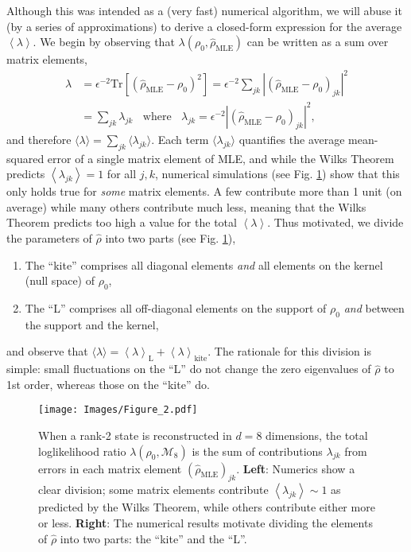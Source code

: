 \documentclass[aps,pra, twocolumn]{revtex4}
\newcommand{\expect}[1]{\ensuremath{\left\langle#1\right\rangle}}
\newcommand{\rhohat}{\hat{\rho}}
\newcommand{\rhoMLE}{\rhohat_{\scriptscriptstyle\mathrm{MLE}}}
\begin{document}
Although this was intended as a (very fast) numerical algorithm, we will abuse it (by a series of approximations) to derive a closed-form expression for the average $\expect{\lambda}$.  We begin by observing that $\lambda(\rho_{0}, \rhoMLE)$ can be written as a sum over matrix elements,
\begin{align}
\label{eq:llrserrors}
\nonumber \lambda &=\epsilon^{-2}\mathrm{Tr}[(\rhoMLE - \rho_{0})^{2}] = \epsilon^{-2}\sum_{jk}|(\rhoMLE- \rho_{0} )_{jk}|^{2}\\
&= \sum_{jk}\lambda_{jk}~~~~\text{where}~~~~\lambda_{jk} = \epsilon^{-2}|(\rhoMLE - \rho_{0} )_{jk} |^{2},
\end{align}
and therefore $\langle \lambda \rangle = \sum_{jk}\langle\lambda_{jk}\rangle$.  Each term $\langle \lambda_{jk}\rangle$ quantifies the average mean-squared error of a single matrix element of MLE, and while the Wilks Theorem predicts $\expect{\lambda_{jk}}=1$ for all $j,k$, numerical simulations (see Fig. \ref{fig:L}) show that this only holds true for \emph{some} matrix elements.  A few contribute more than 1 unit (on average) while many others contribute much less, meaning that the Wilks Theorem predicts too high a value for the total $\expect{\lambda}$.  Thus motivated, we divide the parameters of $\rhohat$ into two parts (see Fig. \ref{fig:L}),
\begin{enumerate}[noitemsep]
\item The ``kite'' comprises all diagonal elements \emph{and} all elements on the kernel (null space) of $\rho_0$,
\item The ``L'' comprises all off-diagonal elements on the support of $\rho_0$ \emph{and} between the support and the kernel,
\end{enumerate}
and observe that $\langle\lambda\rangle = \expect{\lambda}_{\mathrm{L}} + \expect{\lambda}_{\mathrm{kite}}$.  The rationale for this division is simple:  small fluctuations on the ``L'' do not change the zero eigenvalues of $\hat\rho$ to 1st order, whereas those on the ``kite'' do.    

\begin{figure}[h]
\texttt{[image: Images/Figure\_2.pdf]}
 \caption{When a rank-2 state is reconstructed in $d=8$ dimensions, the total loglikelihood ratio $\lambda(\rho_0,\mathcal{M}_8)$ is the sum of contributions $\lambda_{jk}$ from errors in each matrix element $(\rhoMLE)_{jk}$.  \textbf{Left}:  Numerics show a clear division; some matrix elements contribute $\expect{\lambda_{jk}}\sim1$ as predicted by the Wilks Theorem, while others contribute either more or less. \textbf{Right}:  The numerical results motivate dividing the elements of $\rhohat$ into two parts: the ``kite'' and the ``L''.}
\label{fig:L}
\end{figure}
\end{document}
